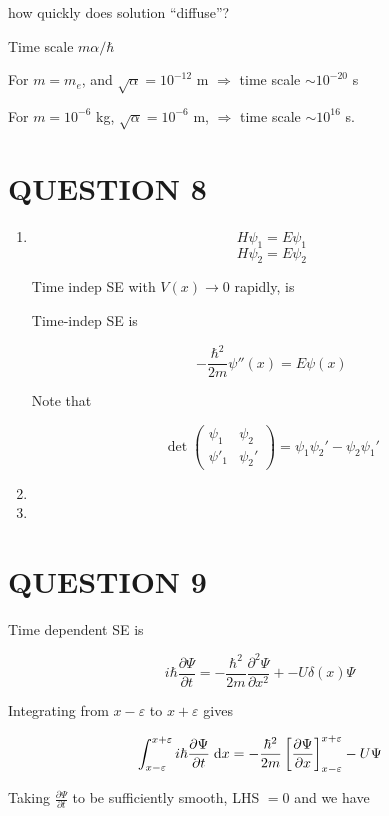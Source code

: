 \documentclass[a4paper]{article}
\begin{document}
how quickly does solution ``diffuse''?

Time scale $ m \alpha / \hbar  $

For $ m = m_{e} $, and $ \sqrt{\alpha} = 10^{-12} $ m $ \Rightarrow $ time scale $ \sim 10^{-20} $ s

For $ m = 10^{-6} $ kg, $ \sqrt{\alpha} = 10^{-6} $ m, $ \Rightarrow $ time scale $ \sim 10^{16} $ s. 

\section{QUESTION 8}


\begin{enumerate}
	\item \[ H \psi_{1} = E \psi_{1} \]
	\[ H \psi_{2} = E \psi_{2} \]
	
	Time indep SE with $ V(x) \to 0 $ rapidly, is
	
	Time-indep SE is
	
	\[ - \frac{\hbar^{2}}{2m}\psi''(x)  = E \psi(x) \]
	
	Note that 
	
	\[ \det \begin{pmatrix}
	\psi_{1} & \psi_{2} \\
	\psi'_{1} & \psi_{2}'
	\end{pmatrix} = \psi_{1} \psi_{2}'  - \psi_{2} \psi_{1}'  \] 
	
	\item 
	\item
	
\end{enumerate}


\section{QUESTION 9}  

Time dependent SE is    

\[ i \hbar \frac{\partial \Psi }{\partial t} = - \frac{\hbar^{2}}{2m} \frac{\partial^{2} \Psi }{\partial x^{2}} + -U \delta(x) \Psi \]

Integrating from $ x - \varepsilon $ to $  x + \varepsilon $ gives

\[ \int_{x-\varepsilon}^{x+\varepsilon}  i \hbar \frac{\partial \Psi }{\partial t} \; \mathrm{d} x= - \frac{\hbar^{2}}{2m} \left[ \frac{\partial \Psi }{\partial x} \right]_{x - \varepsilon}^{x + \varepsilon} -  U \Psi  \]

Taking $ \frac{\partial \Psi }{\partial t} $ to be sufficiently smooth, LHS $ = 0 $ and we have
\end{document}

